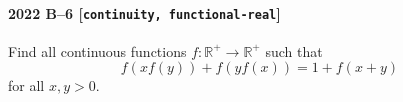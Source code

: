 \paragraph{2022 B--6 \textnormal{[\texttt{continuity, functional-real}]}}
Find all continuous functions $f: \mathbb{R}^+ \to \mathbb{R}^+$ such that
\[
f(xf(y)) + f(yf(x)) = 1 + f(x+y)
\]
for all $x,y > 0$.
